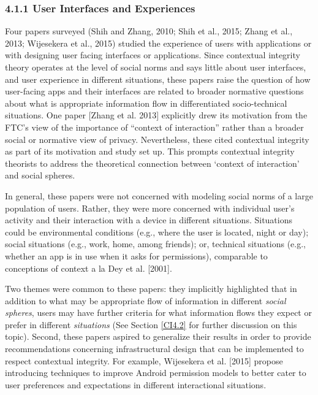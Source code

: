 \documentclass[../thesis.tex]{subfiles}
\begin{document}
\subsubsection{4.1.1 User Interfaces and Experiences}
\label{CI4.1.1}

Four papers surveyed (Shih and Zhang,
2010; Shih et al., 2015; Zhang et al.,
2013; Wijesekera et al.,
2015) studied the experience of users
with applications or with designing user facing interfaces or
applications. Since contextual integrity theory operates at the level
of social norms and says little about user interfaces, and user
experience in different situations, these papers raise the question of
how user-facing apps and their interfaces are related to broader
normative questions about what is appropriate information flow in
differentiated socio-technical situations. One paper
[Zhang et al. 2013] explicitly drew its motivation from
the FTC's view of the importance of
``context of interaction'' rather
than a broader social or normative view of privacy. Nevertheless, these
cited contextual integrity as part of its motivation and study set up.
This prompts contextual integrity theorists to address the theoretical
connection between `context of
interaction' and social spheres.

In general, these papers were not concerned with modeling social norms
of a large population of users. Rather, they were more concerned with
individual user's activity and their interaction with a
device in different situations. Situations could be environmental
conditions (e.g., where the user is located, night or day); social
situations (e.g., work, home, among friends); or, technical situations
(e.g., whether an app is in use when it asks for permissions),
comparable to conceptions of context a la Dey et al. [2001].

Two themes were common to these papers: they implicitly highlighted that
in addition to what may be appropriate flow of information in different
\textit{social spheres}, users may have further criteria for what
information flows they expect or prefer in different
\textit{situations} (See Section \ref{CI4.2} for further discussion on this
topic). Second, these papers aspired to generalize their results in
order to provide recommendations concerning infrastructural design that
can be implemented to respect contextual integrity. For example,
Wijesekera et al. [2015] propose
introducing techniques to improve Android permission models to better
cater to user preferences and expectations in different interactional
situations.
\end{document}
